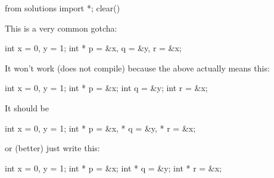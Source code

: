 \begin{python0}
from solutions import *; clear()
\end{python0}

This is a very common gotcha:

\begin{consolethree}[escapeinside=||]
int x = 0, y = 1;
int * p = &x, q = &y, r = &x;
\end{consolethree}
It won't work (does not compile) because the above actually means this:

\begin{consolethree}[escapeinside=||]
int x = 0, y = 1;
int * p = \&x;
int q = \&y;
int r = \&x;
\end{consolethree}
It should be

\begin{consolethree}[escapeinside=||]
int x = 0, y = 1;
int * p = \&x, * q = \&y, * r = \&x;
\end{consolethree}
or (better) just write this:

\begin{consolethree}[escapeinside=||]
int x = 0, y = 1;
int * p = \&x;
int * q = \&y;
int * r = \&x;
\end{consolethree}

